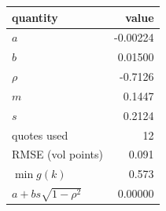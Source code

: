 \begin{center}\small
\begin{tabular}{|l|r|}
\hline
quantity & value \\ \hline
$a$ & -0.00224 \\
$b$ & 0.01500 \\
$\rho$ & -0.7126 \\
$m$ & 0.1447 \\
$s$ & 0.2124 \\
quotes used & 12 \\
RMSE (vol points) & 0.091 \\
$\min g(k)$ & 0.573 \\
$a+bs\sqrt{1-\rho^2}$ & 0.00000 \\
\hline
\end{tabular}
\end{center}
